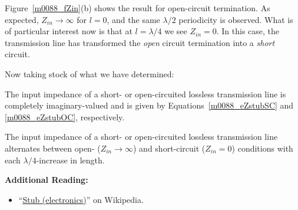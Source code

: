 Figure~\ref{m0088_fZin}(b) shows the result for open-circuit termination.
As expected, $Z_{in}\rightarrow\infty$ for $l=0$, and the same $\lambda/2$ periodicity is observed.
What is of particular interest now is that at $l=\lambda/4$ we see $Z_{in}=0$. In this case, the transmission line has transformed the \emph{open} circuit termination into a \emph{short} circuit.  

Now taking stock of what we have determined:

\begin{mdframed}[backgroundcolor=yellow!20,nobreak=true] 
The input impedance of a short- or open-circuited lossless transmission line is completely imaginary-valued and is given by Equations~\ref{m0088_eZstubSC} and \ref{m0088_eZstubOC}, respectively. 
\end{mdframed}

\begin{mdframed}[backgroundcolor=yellow!20,nobreak=true] 
The input impedance of a short- or open-circuited lossless transmission line alternates between open- ($Z_{in}\rightarrow\infty$) and short-circuit ($Z_{in}=0$) conditions with each $\lambda/4$-increase in length. 
\end{mdframed}

{\bf Additional Reading:}
\begin{itemize}
\item ``\href{https://en.wikipedia.org/wiki/Stub_(electronics)}{Stub (electronics)}'' on Wikipedia.
\end{itemize}

